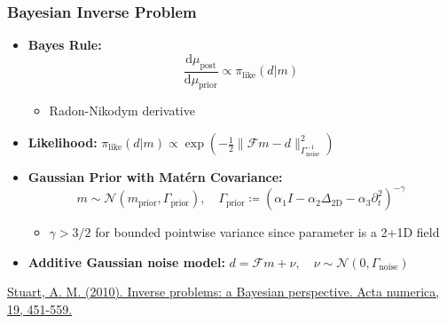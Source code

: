 \begin{frame}
    \frametitle{Bayesian Inverse Problem}
    \begin{itemize}
        \item \textbf{Bayes Rule:}
        \[
        \frac{\text{d}\mu_{\text{post}}}{\text{d}\mu_{\text{prior}}} \propto \pi_{\text{like}}(d|m)
        \]
        \begin{itemize}
            \item Radon-Nikodym derivative
        \end{itemize}
        \item \textbf{Likelihood:} \(\pi_{\text{like}}(d|m) \propto \exp\left(-\frac{1}{2} \|\mathcal{F}m - d\|_{\Gamma_{\!\text{noise}}^{-1}}^2\right)\)
        \item \textbf{Gaussian Prior with Matérn Covariance:}
        \[
        m \sim \mathcal{N}(m_{\text{prior}}, \Gamma_{\!\text{prior}}), \quad \Gamma_{\!\text{prior}} \coloneqq \left( \alpha_1 I - \alpha_2 \Delta_{\text{2D}} - \alpha_3 \partial_t^2 \right)^{-\gamma}
        \]
        \begin{itemize}
            \item \(\gamma \gt 3/2\) for bounded pointwise variance since parameter is a 2+1D field
        \end{itemize}
        \item \textbf{Additive Gaussian noise model:} \(d = \mathcal{F}m + \nu, \quad \nu \sim \mathcal{N}(0, \Gamma_{\!\text{noise}})\)
    \end{itemize}
    \footnotesize{\href{https://www.cambridge.org/core/journals/acta-numerica/article/inverse-problems-a-bayesian-perspective/587A3A0D480A1A7C2B1B284BCEDF7E23}{Stuart, A. M. (2010). Inverse problems: a Bayesian perspective. Acta numerica, 19, 451-559.}}
\end{frame}

